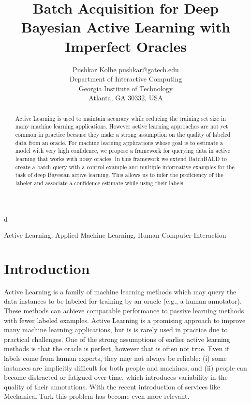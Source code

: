 \documentclass[twoside,11pt]{article}
\begin{document}
\title{Batch Acquisition for Deep Bayesian Active Learning with Imperfect Oracles}

\author{\name Pushkar Kolhe \email pushkar@gatech.edu \\
       \addr Department of Interactive Computing\\
       Georgia Institute of Technology\\
       Atlanta, GA 30332, USA}

\editor{}

\maketitle

\begin{abstract}%
Active Learning is used to maintain accuracy while reducing the training set size in many machine learning applications. However active learning approaches are not yet common in practice because they make a strong assumption on the quality of labeled data from an oracle. For machine learning applications whose goal is to estimate a model with very high confidence, we propose a framework for querying data in active learning that works with noisy oracles. In this framework we extend BatchBALD \citep{kirsch2019batchbald} to create a batch query with a control example and multiple informative examples for the task of deep Bayesian active learning. This allows us to infer the proficiency of the labeler and associate a confidence estimate while using their labels.
\end{abstract} d

\begin{keywords}
  Active Learning, Applied Machine Learning, Human-Computer Interaction
\end{keywords}

\section{Introduction}

Active Learning is a family of machine learning methods which may query the data instances to be labeled for training by an oracle (e.g., a human annotator). These methods can achieve comparable performance to passive learning methods with fewer labeled examples. Active Learning is a promising approach to improve many machine learning applications, but is is rarely used in practice due to practical challenges. One of the strong assumptions of earlier active learning methods is that the oracle is perfect, however that is often not true. Even  if  labels  come  from  human  experts, they may not always be reliable:  (i) some instances are implicitly difficult for both people and machines, and (ii) people can become distracted or fatigued over time, which introduces variability in the quality of their annotations. With the recent introduction of services like Mechanical Turk this problem has become even more relevant.
\end{document}
